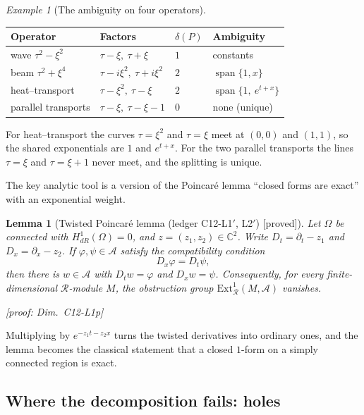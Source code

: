 \documentclass[11pt]{article}
\theoremstyle{plain}
\newtheorem{lemma}[theorem]{Lemma}
\theoremstyle{definition}
\theoremstyle{remark}
\newtheorem{example}[theorem]{Example}
\newcommand{\C}{\mathbb{C}}
\newcommand{\ring}{\mathcal{R}}            %
\DeclareMathOperator{\spn}{span}
\newcommand{\badge}[2]{\textcolor{#1}{\textsf{\footnotesize[#2]}}}
\newcommand{\proved}[1][]{\badge{cC}{proved#1}}
\newcommand{\led}[1]{\textcolor{cG}{\textsf{\footnotesize(ledger #1)}}}
\newcommand{\dimref}[1]{\textsf{\footnotesize[proof: Dim.~#1]}}
\begin{document}
\begin{example}[{The ambiguity on four operators}]
\begin{center}\small
\begin{tabular}{@{}L{3.0cm}L{4.4cm}L{1.0cm}L{4.4cm}@{}}
\toprule
Operator & Factors & $\delta(P)$ & Ambiguity\\\midrule
wave $\tau^2-\xi^2$ & $\tau-\xi,\ \tau+\xi$ & $1$ & constants\\
beam $\tau^2+\xi^4$ & $\tau-i\xi^2,\ \tau+i\xi^2$ & $2$ & $\spn\{1,x\}$\\
heat--transport & $\tau-\xi^2,\ \tau-\xi$ & $2$ & $\spn\{1,\ e^{t+x}\}$\\
parallel transports & $\tau-\xi,\ \tau-\xi-1$ & $0$ & none (unique)\\\bottomrule
\end{tabular}
\end{center}
For heat--transport the curves $\tau=\xi^2$ and $\tau=\xi$ meet at $(0,0)$ and $(1,1)$, so the shared exponentials are $1$ and $e^{t+x}$. For the two parallel transports the lines $\tau=\xi$ and $\tau=\xi+1$ never meet, and the splitting is unique.
\end{example}

The key analytic tool is a version of the Poincar\'e lemma ``closed forms are exact'' with an exponential weight.

\begin{lemma}[{Twisted Poincar\'e lemma \led{C12-L1$'$, L2$'$} \proved}]\label{lem:twisted}
Let $\Omega$ be connected with $H^1_{dR}(\Omega)=0$, and $z=(z_1,z_2)\in\C^2$. Write $D_t=\partial_t-z_1$ and $D_x=\partial_x-z_2$. If $\varphi,\psi\in\mathcal A$ satisfy the compatibility condition
\[
D_x\varphi=D_t\psi,
\]
then there is $w\in\mathcal A$ with $D_tw=\varphi$ and $D_xw=\psi$. Consequently, for every finite-dimensional $\ring$-module $M$, the obstruction group $\mathrm{Ext}^1_\ring(M,\mathcal A)$ vanishes.

\dimref{C12-L1p}
\end{lemma}

Multiplying by $e^{-z_1t-z_2x}$ turns the twisted derivatives into ordinary ones, and the lemma becomes the classical statement that a closed $1$-form on a simply connected region is exact.

\subsection{Where the decomposition fails: holes}
\end{document}
